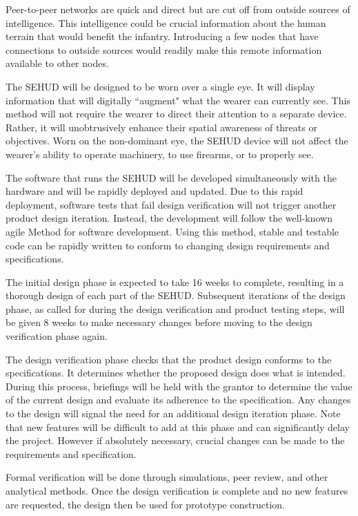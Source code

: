 Peer-to-peer networks are quick and direct but are cut off from outside
sources of intelligence. This intelligence could be crucial information about
the human terrain that would benefit the infantry. Introducing a few nodes
that have connections to outside sources would readily make this remote
information available to other nodes.

The SEHUD will be designed to be worn over a single eye. It will display
information that will digitally ``augment" what the wearer can currently see.
This method will not require the wearer to direct their attention to a
separate device. Rather, it will unobtrusively enhance their spatial awareness
of threats or objectives. Worn on the non-dominant eye, the SEHUD device
will not affect the wearer's ability to operate machinery, to use firearms,
or to properly see.

The software that runs the SEHUD will be developed simultaneously with the
hardware and will be rapidly deployed and updated. Due to this rapid
deployment, software tests that fail design verification will not trigger
another product design iteration. Instead, the development will follow the
well-known agile Method for software development. Using this method, stable
and testable code can be rapidly written to conform to changing design
requirements and specifications.

The initial design phase is expected to take 16 weeks to complete, resulting
in a thorough design of each part of the SEHUD. Subsequent iterations of the
design phase, as called for during the design verification and product
testing steps, will be given 8 weeks to make necessary changes before moving
to the design verification phase again.

The design verification phase checks that the product design conforms to the
specifications. It determines whether the proposed design does what is
intended. During this process, briefings will be held with the grantor to
determine the value of the current design and evaluate its adherence to the
specification. Any changes to the design will signal the need for an
additional design iteration phase. Note that new features will be difficult
to add at this phase and can significantly delay the project. However if
absolutely necessary, crucial changes can be made to the requirements and
specification.

Formal verification will be done through simulations, peer review, and other
analytical methods. Once the design verification is complete and no new
features are requested, the design then be used for prototype construction.

